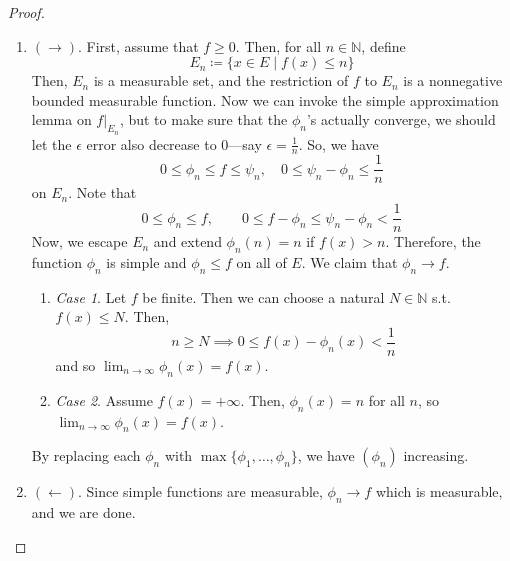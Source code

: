 \begin{proof}
    \begin{enumerate}
      \item $(\rightarrow)$. First, assume that $f \geq 0$. Then, for all $n \in \mathbb{N}$, define 
      \begin{equation}
        E_n \coloneqq \{ x \in E \mid f(x) \leq n \}
      \end{equation}
      Then, $E_n$ is a measurable set, and the restriction of $f$ to $E_n$ is a nonnegative bounded measurable function. Now we can invoke the simple approximation lemma on $f|_{E_n}$, but to make sure that the $\phi_n$'s actually converge, we should let the $\epsilon$ error also decrease to $0$---say $\epsilon = \frac{1}{n}$. So, we have 
      \begin{equation}
        0 \leq \phi_n \leq f \leq \psi_n, \quad 0 \leq \psi_n - \phi_n \leq \frac{1}{n}
      \end{equation}
      on $E_n$. Note that 
      \begin{equation}
        0 \leq \phi_n \leq f, \qquad 0 \leq f - \phi_n \leq \psi_n - \phi_n < \frac{1}{n} 
      \end{equation}
      Now, we escape $E_n$ and extend $\phi_n (n) = n$ if $f(x) > n$. Therefore, the function $\phi_n$ is simple and $\phi_n \leq f$ on all of $E$. We claim that $\phi_n \to f$. 
      \begin{enumerate}
        \item \textit{Case 1}. Let $f$ be finite. Then we can choose a natural $N \in \mathbb{N}$ s.t. $f(x) \leq N$. Then, 
        \begin{equation}
          n \geq N \implies 0 \leq f(x) - \phi_n (x) < \frac{1}{n} 
        \end{equation}
        and so $\lim_{n \to \infty} \phi_n (x) = f(x)$. 

        \item \textit{Case 2}. Assume $f(x) = +\infty$. Then, $\phi_n (x) = n$ for all $n$, so $\lim_{n \to \infty} \phi_n (x) = f(x)$. 
      \end{enumerate}
      By replacing each $\phi_n$ with $\max\{\phi_1, \ldots, \phi_n\}$, we have $(\phi_n)$ increasing. 

      \item $(\leftarrow)$. Since simple functions are measurable, $\phi_n \to f$ which is measurable, and we are done. 
    \end{enumerate}
  \end{proof}
